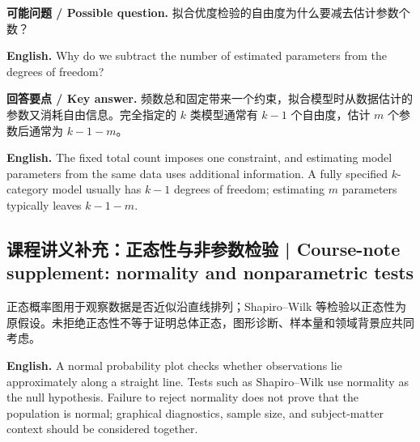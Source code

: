 \documentclass[UTF8,11pt,a4paper]{ctexart}
\newcommand{\EN}[1]{\par\noindent\textbf{English.} #1\par}
\newcommand{\ASK}[4]{\par\noindent\textbf{可能问题 / Possible question.} #1\par\EN{#2}\noindent\textbf{回答要点 / Key answer.} #3\par\EN{#4}\medskip}
\begin{document}
\ASK{拟合优度检验的自由度为什么要减去估计参数个数？}{Why do we subtract the number of estimated parameters from the degrees of freedom?}{频数总和固定带来一个约束，拟合模型时从数据估计的参数又消耗自由信息。完全指定的 $k$ 类模型通常有 $k-1$ 个自由度，估计 $m$ 个参数后通常为 $k-1-m$。}{The fixed total count imposes one constraint, and estimating model parameters from the same data uses additional information. A fully specified $k$-category model usually has $k-1$ degrees of freedom; estimating $m$ parameters typically leaves $k-1-m$.}

\subsection*{课程讲义补充：正态性与非参数检验 | Course-note supplement: normality and nonparametric tests}
\noindent 正态概率图用于观察数据是否近似沿直线排列；Shapiro--Wilk 等检验以正态性为原假设。未拒绝正态性不等于证明总体正态，图形诊断、样本量和领域背景应共同考虑。
\EN{A normal probability plot checks whether observations lie approximately along a straight line. Tests such as Shapiro--Wilk use normality as the null hypothesis. Failure to reject normality does not prove that the population is normal; graphical diagnostics, sample size, and subject-matter context should be considered together.}
\end{document}
